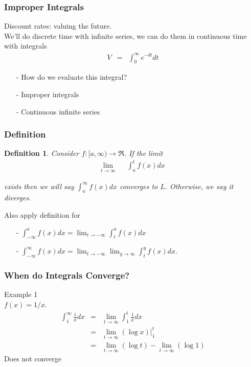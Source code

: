 \documentclass{beamer}
\newtheorem{defn}{Definition}
\numberwithin{equation}{section}
\begin{document}
\begin{frame}
\frametitle{Improper Integrals}

Discount rates: valuing the future.\\
We'll do discrete time with infinite series, we can do them in continuous time with integrals
\begin{eqnarray}
V & = & \int_{0}^{\infty} e^{-\delta t } dt \nonumber 
\end{eqnarray}


\begin{itemize}
\item[-] How do we evaluate this integral?
\item[-] \alert{Improper integrals}
\item[-] \alert{Continuous} infinite series
\end{itemize}


\end{frame}

\begin{frame}
\frametitle{Definition}

\begin{defn} Consider $f:[a, \infty) \rightarrow \Re$.  If the limit 
\begin{eqnarray}
\lim_{t \rightarrow \infty} && \int_{a}^{t} f(x) dx \nonumber 
\end{eqnarray}

exists then we will say $\int_{a}^{\infty} f(x)dx$ \alert{converges} to $L$.  Otherwise, we say it \alert{diverges}. \\



\end{defn}


Also apply definition for
\begin{itemize}
\item[-] $\int_{-\infty}^{a} f(x)dx = \lim_{t\rightarrow -\infty } \int_{t}^{a} f(x)dx $ 
\item[-] $\int_{-\infty}^{\infty} f(x)dx= \lim_{t\rightarrow -\infty } \lim_{y\rightarrow \infty} \int_{t}^{y} f(x)dx$.  
\end{itemize}
\end{frame}

\begin{frame}
\frametitle{When do Integrals Converge?}

Example 1\\
 $f(x) = 1/x$.  
\begin{eqnarray}
\int_{1}^{\infty} \frac{1}{x} dx & = & \lim_{t \rightarrow \infty} \int_{1}^{t} \frac{1}{x}  dx\nonumber \\
										& = & \lim_{t \rightarrow \infty} (\log x)|_{1}^{t} \nonumber \\
										& = & \lim_{t \rightarrow \infty} (\log t) - \lim_{t \rightarrow \infty} (\log 1) \nonumber 
\end{eqnarray}
\alert{Does not converge}										


\end{frame}
\end{document}
